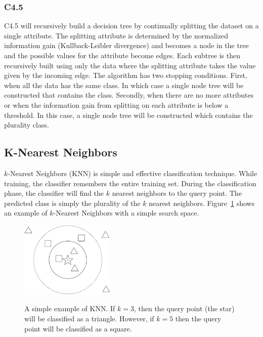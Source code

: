 \documentclass[12pt]{ucthesis}
\newcommand{\captionfonts}{\small\bf\ssp}
\begin{document}
\subsubsection{C4.5}
\label{background-classification-classifiers-j48-c45}
C4.5 will recursively build a decision tree by continually splitting the dataset on a single attribute\cite{Quinlan}.
The splitting attribute is determined by the normalized information gain (Kullback-Leibler divergence) and becomes a
node in the tree and the possible values for the attribute become edges. Each subtree is then recursively built using only the
data where the splitting attribute takes the value given by the incoming edge. The algorithm has two stopping conditions.
First, when all the data has the same class. In which case a single node tree will be constructed that contains the class.
Secondly, when there are no more attributes or when the information gain from splitting on each attribute is below a threshold.
In this case, a single node tree will be constructed which contains the plurality class.

\subsection{K-Nearest Neighbors}
\label{background-classification-classifiers-knn}
$k$-Nearest Neighbors (KNN) is simple and effective classification technique\cite{Duda}.
While training, the classifier remembers the entire training set.
During the classification phase, the classifier will find the $k$ nearest neighbors
to the query point. The predicted class is simply the plurality of the $k$ nearest neighbors.
Figure~\ref{fig:knn} shows an example of $k$-Nearest Neighbors with a simple search space.

\begin{figure}
   \begin{center}
      \includegraphics[width=0.4\textwidth]{images/KNN.eps}
      \captionfonts
      \caption[K-Nearest Neighbors]{A simple example of KNN. If $k = 3$, then the query point (the star) will be classified as a triangle. However, if $k = 5$ then the query point will be classified as a square.}
      \label{fig:knn}
   \end{center}
\end{figure}
\end{document}
